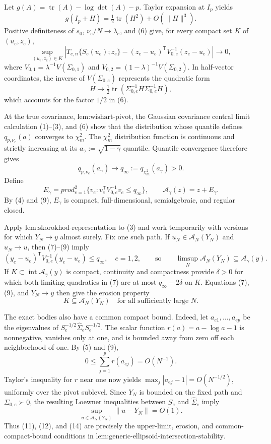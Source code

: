 Let \(g(A)=\operatorname{tr}(A)-\log\det(A)-p\).  Taylor expansion at \(I_p\) yields
\[
 g(I_p+H)=\tfrac12\operatorname{tr}(H^2)+O(\lVert H\rVert^3).
 \tag{6}
\]
Positive definiteness of \(s_0\), \(\nu_e/N\to\lambda_e\), and (6) give, for every compact set \(K\) of \((u_e,z_e)\),
\[
 \sup_{(u_e,z_e)\in K}
 \left|T_{e,n}\{S_e(u_e);z_e\}
 -(z_e-u_e)^{\mathsf T}V_{0,e}^{-1}(z_e-u_e)
 \right|\longrightarrow0,
 \tag{7}
\]
where \(V_{0,1}=\lambda^{-1}V(\Sigma_{0,1})\) and \(V_{0,2}=(1-\lambda)^{-1}V(\Sigma_{0,2})\).  In half-vector coordinates, the inverse of \(V(\Sigma_{0,e})\) represents the quadratic form
\[
 H\longmapsto\tfrac12
 \operatorname{tr}(\Sigma_{0,e}^{-1}H\Sigma_{0,e}^{-1}H),
 \tag{8}
\]
which accounts for the factor \(1/2\) in (6).

At the true covariance, \(\text{lem:wishart-pivot}\), the Gaussian covariance central limit calculation (1)--(3), and (6) show that the distribution whose quantile defines \(q_{p,\nu_e}(a)\) converges to \(\chi_m^2\).  The \(\chi_m^2\) distribution function is continuous and strictly increasing at its \(a_\gamma:=\sqrt{1-\gamma}\) quantile.  Quantile convergence therefore gives
\[
 q_{p,\nu_e}(a_\gamma)\longrightarrow
 q_\infty:=q_{\chi_m^2}(a_\gamma)>0.
 \tag{9}
\]
Define
\[
 E_\gamma=prod_{e=1}^2
 \{v_e:v_e^{\mathsf T}V_{0,e}^{-1}v_e\le q_\infty\},
 \qquad
 \mathcal A_\gamma(z)=z+E_\gamma.
 \tag{10}
\]
By (4) and (9), \(E_\gamma\) is compact, full-dimensional, semialgebraic, and regular closed.

Apply \(\text{lem:skorokhod-representation}\) to (3) and work temporarily with versions for which \(Y_N\to y\) almost surely.  Fix one such path.  If \(u_N\in\mathcal A_N(Y_N)\) and \(u_N\to u\), then (7)--(9) imply
\[
 (y_e-u_e)^{\mathsf T}V_{0,e}^{-1}(y_e-u_e)\le q_\infty,
 \quad e=1,2,
 \qquad\text{so}\qquad
 \limsup_N\mathcal A_N(Y_N)\subseteq\mathcal A_\gamma(y).
 \tag{11}
\]
If \(K\subset\operatorname{int}\mathcal A_\gamma(y)\) is compact, continuity and compactness provide \(\delta>0\) for which both limiting quadratics in (7) are at most \(q_\infty-2\delta\) on \(K\).  Equations (7), (9), and \(Y_N\to y\) then give the erosion property
\[
 K\subseteq\mathcal A_N(Y_N)
 \quad\text{for all sufficiently large }N.
 \tag{12}
\]

The exact bodies also have a common compact bound.  Indeed, let \(a_{e1},\ldots,a_{ep}\) be the eigenvalues of \(S_e^{-1/2}\widehat\Sigma_eS_e^{-1/2}\).  The scalar function \(r(a)=a-\log a-1\) is nonnegative, vanishes only at one, and is bounded away from zero off each neighborhood of one.  By (5) and (9),
\[
 0\le\sum_{j=1}^p r(a_{ej})=O(N^{-1}).
 \tag{13}
\]
Taylor's inequality for \(r\) near one now yields \(\max_j|a_{ej}-1|=O(N^{-1/2})\), uniformly over the pivot sublevel.  Since \(Y_N\) is bounded on the fixed path and \(\Sigma_{0,e}\succ0\), the resulting Loewner inequalities between \(S_e\) and \(\widehat\Sigma_e\) imply
\[
 \sup_{u\in\mathcal A_N(Y_N)}\lVert u-Y_N\rVert=O(1).
 \tag{14}
\]
Thus (11), (12), and (14) are precisely the upper-limit, erosion, and common-compact-bound conditions in \(\text{lem:generic-ellipsoid-intersection-stability}\).

